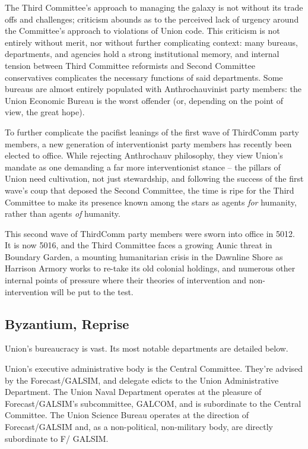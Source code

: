 The Third Committee's approach to managing the galaxy is not without its trade offs and
challenges; criticism abounds as to the perceived lack of urgency around the Committee's
approach to violations of Union code. This criticism is not entirely without merit, nor without further
complicating context: many bureaus, departments, and agencies hold a strong institutional
memory, and internal tension between Third Committee reformists and Second Committee
conservatives complicates the necessary functions of said departments. Some bureaus are
almost entirely populated with Anthrochauvinist party members: the Union Economic Bureau is
the worst offender (or, depending on the point of view, the great hope).

To further complicate the pacifist leanings of the first wave of ThirdComm party members, a new
generation of interventionist party members has recently been elected to office. While rejecting
Anthrochauv philosophy, they view Union's mandate as one demanding a far more interventionist
stance -- the pillars of Union need cultivation, not just stewardship, and following the success of
the first wave's coup that deposed the Second Committee, the time is ripe for the Third
Committee to make its presence known among the stars as agents \textit{for} humanity, rather than
agents \textit{of} humanity.

This second wave of ThirdComm party members were sworn into office in 5012. It is now 5016,
and the Third Committee faces a growing Aunic threat in Boundary Garden, a mounting
humanitarian crisis in the Dawnline Shore as Harrison Armory works to re-take its old colonial
holdings, and numerous other internal points of pressure where their theories of intervention and
non-intervention will be put to the test.

\subsection{Byzantium, Reprise }

Union's bureaucracy is vast. Its most notable departments are detailed below.

Union's executive administrative body is the Central Committee. They're advised by the
Forecast/GALSIM, and delegate edicts to the Union Administrative Department. The Union Naval
Department operates at the pleasure of Forecast/GALSIM's subcommittee, GALCOM, and is
subordinate to the Central Committee. The Union Science Bureau operates at the direction of
Forecast/GALSIM and, as a non-political, non-military body, are directly subordinate to F/
GALSIM.

